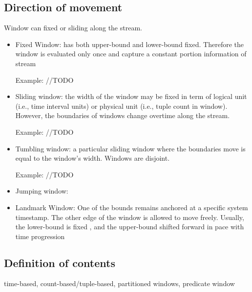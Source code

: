 \subsection{Direction of movement}
Window can fixed or sliding along the stream.
\begin{itemize}

\item Fixed Window:  has both upper-bound and lower-bound fixed. Therefore the window is evaluated only once and capture a constant portion information of stream

Example: //TODO

\item Sliding window: the width of the window may be fixed in term of logical unit (i.e., time interval units) or physical unit (i.e., tuple count in window). However, the boundaries of windows change overtime along the stream.

Example: //TODO

\item Tumbling window: a particular sliding window where the boundaries move is equal to the window's width. Windows are disjoint.

Example: //TODO

\item Jumping window:

\item Landmark Window: One of the bounds remains  anchored at a specific system timestamp. The other edge of the window is allowed to move freely. Usually, the lower-bound is fixed , and the upper-bound shifted forward in pace with time progression

\end{itemize}


\subsection{Definition of contents} time-based, count-based/tuple-based, partitioned windows, predicate window

